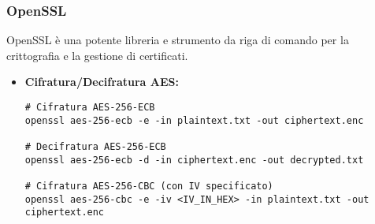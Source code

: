 \subsubsection{OpenSSL}
OpenSSL è una potente libreria e strumento da riga di comando per la crittografia e la gestione di certificati.
\begin{itemize}
    \item \textbf{Cifratura/Decifratura AES:}
    \begin{verbatim}
# Cifratura AES-256-ECB
openssl aes-256-ecb -e -in plaintext.txt -out ciphertext.enc

# Decifratura AES-256-ECB
openssl aes-256-ecb -d -in ciphertext.enc -out decrypted.txt

# Cifratura AES-256-CBC (con IV specificato)
openssl aes-256-cbc -e -iv <IV_IN_HEX> -in plaintext.txt -out ciphertext.enc


\end{verbatim}
\end{itemize}
